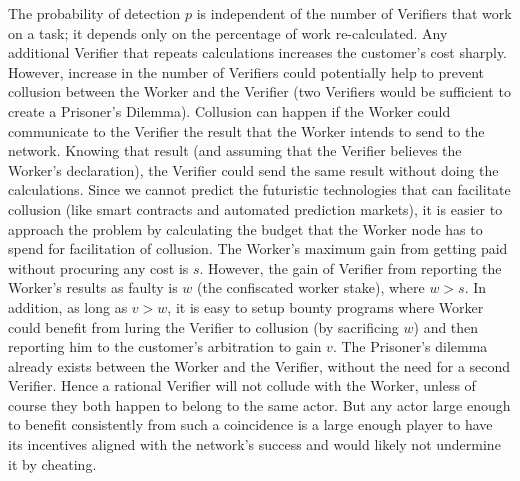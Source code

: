 \documentclass{article}
\begin{document}
The probability of detection $p$ is independent of the number of Verifiers that work on a task; it depends only on the percentage of work re-calculated. Any additional Verifier that repeats calculations increases the customer's cost sharply. However, increase in the number of Verifiers could potentially help to prevent collusion between the Worker and the Verifier (two Verifiers would be sufficient to create a Prisoner's Dilemma). Collusion can happen if the Worker could communicate to the Verifier the result that the Worker intends to send to the network. Knowing that result (and assuming that the Verifier believes the Worker's declaration), the Verifier could send the same result without doing the calculations. Since we cannot predict the futuristic technologies that can facilitate collusion (like smart contracts and automated prediction markets), it is easier to approach the problem by calculating the budget that the Worker node has to spend for facilitation of collusion. The Worker's maximum gain from getting paid without procuring any cost is $s$. However, the gain of Verifier from reporting the Worker's results as faulty is $w$ (the confiscated worker stake), where $w>s$. In addition, as long as $v>w$, it is easy to setup bounty programs where Worker could benefit from luring the Verifier to collusion (by sacrificing $w$) and then reporting him to the customer's arbitration to gain $v$. The Prisoner's dilemma already exists between the Worker and the Verifier, without the need for a second Verifier. Hence a rational Verifier will not collude with the Worker, unless of course they both happen to belong to the same actor. But any actor large enough to benefit consistently from such a coincidence is a large enough player to have its incentives aligned with the network's success and would likely not undermine it by cheating.
\end{document}
